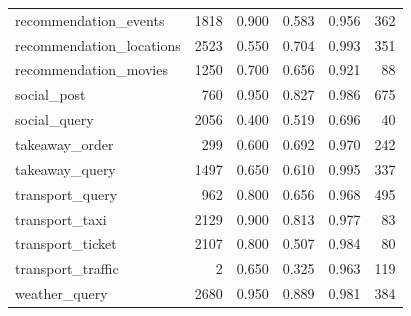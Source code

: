 \begin{longtable}{lrrrrr}
recommendation\_events & 1818 & 0.900 & 0.583 & 0.956 & 362 \\
recommendation\_locations & 2523 & 0.550 & 0.704 & 0.993 & 351 \\
recommendation\_movies & 1250 & 0.700 & 0.656 & 0.921 & 88 \\
social\_post & 760 & 0.950 & 0.827 & 0.986 & 675 \\
social\_query & 2056 & 0.400 & 0.519 & 0.696 & 40 \\
takeaway\_order & 299 & 0.600 & 0.692 & 0.970 & 242 \\
takeaway\_query & 1497 & 0.650 & 0.610 & 0.995 & 337 \\
transport\_query & 962 & 0.800 & 0.656 & 0.968 & 495 \\
transport\_taxi & 2129 & 0.900 & 0.813 & 0.977 & 83 \\
transport\_ticket & 2107 & 0.800 & 0.507 & 0.984 & 80 \\
transport\_traffic & 2 & 0.650 & 0.325 & 0.963 & 119 \\
weather\_query & 2680 & 0.950 & 0.889 & 0.981 & 384 \\
\end{longtable}

